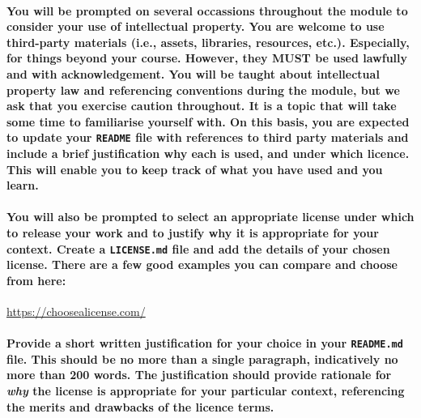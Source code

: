 \documentclass{../../fal_assignment}
\begin{document}

\paragraph{You will be prompted on several occassions throughout the module to consider your use of intellectual property. You are welcome to use third-party materials (i.e., assets, libraries, resources, etc.). Especially, for things beyond your course. However, they \textbf{MUST} be used lawfully and with acknowledgement. You will be taught about intellectual property law and referencing conventions during the module, but we ask that you exercise caution throughout. It is a topic that will take some time to familiarise yourself with. On this basis, you are expected to update your \texttt{README} file with references to third party materials and include a brief justification why each is used, and under which licence. This will enable you to keep track of what you have used and you learn.}

\paragraph{You will also be prompted to select an appropriate license under which to release your work and to justify why it is appropriate for your context. Create a \texttt{LICENSE.md} file and add the details of your chosen license. There are a few good examples you can compare and choose from here:}

\url{https://choosealicense.com/}

\paragraph{Provide a short written justification for your choice in your \texttt{README.md} file. This should be no more than a single paragraph, indicatively no more than 200 words. The justification should provide rationale for \textit{why} the license is appropriate for your particular context, referencing the merits and drawbacks of the licence terms.}
\end{document}
